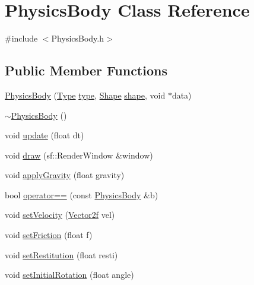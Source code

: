 \hypertarget{class_physics_body}{}\section{Physics\+Body Class Reference}
\label{class_physics_body}


{\ttfamily \#include $<$Physics\+Body.\+h$>$}

\subsection*{Public Member Functions}
\begin{DoxyCompactItemize}
\item 
\mbox{\hyperlink{class_physics_body_a129ea9472bad343856460345704d9c5e}{Physics\+Body}} (\mbox{\hyperlink{_physics_body_8h_a1d1cfd8ffb84e947f82999c682b666a7}{Type}} \mbox{\hyperlink{class_physics_body_aec0c643403d115034db77f9556ebb774}{type}}, \mbox{\hyperlink{_physics_body_8h_a55b506070847a13554f8b879c1bfb37c}{Shape}} \mbox{\hyperlink{class_physics_body_aa54a7af3e49e0aa6a4f0c9669baeb24b}{shape}}, void $\ast$data)
\item 
\mbox{\hyperlink{class_physics_body_a4d09ec1845ec536f78d1c2f2fa9d789f}{$\sim$\+Physics\+Body}} ()
\item 
void \mbox{\hyperlink{class_physics_body_abdba5d49a66c2fb3603ab001eafb9730}{update}} (float dt)
\item 
void \mbox{\hyperlink{class_physics_body_a459723ff043e74214d87cb91a57711a4}{draw}} (sf\+::\+Render\+Window \&window)
\item 
void \mbox{\hyperlink{class_physics_body_a7a513590168e6409fe9bee61f21b6689}{apply\+Gravity}} (float gravity)
\item 
bool \mbox{\hyperlink{class_physics_body_a62cc02d08a456fd3ab85a522f7ee1baa}{operator==}} (const \mbox{\hyperlink{class_physics_body}{Physics\+Body}} \&b)
\item 
void \mbox{\hyperlink{class_physics_body_ae9fdcc15def9e51ca02f4dd130fb6595}{set\+Velocity}} (\mbox{\hyperlink{class_vector2f}{Vector2f}} vel)
\item 
void \mbox{\hyperlink{class_physics_body_aa86a8fad1fc91b29d52ca15e1bb3a9bf}{set\+Friction}} (float f)
\item 
void \mbox{\hyperlink{class_physics_body_a97101a5b106a3092eef1340eae81870a}{set\+Restitution}} (float resti)
\item 
void \mbox{\hyperlink{class_physics_body_a648b50e017040632c5298edc65cdc729}{set\+Initial\+Rotation}} (float angle)

\end{DoxyCompactItemize}

